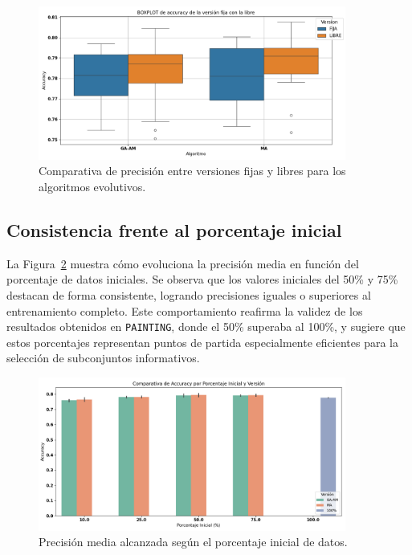 \begin{figure}[htp]
  \centering
  \includegraphics[width=0.9\textwidth]{imagenes/evaluaciones/cifar10/boxplot-libres.png}
  \caption{Comparativa de precisión entre versiones fijas y libres para los algoritmos evolutivos.}
  \label{fig:cifar10_fija_vs_libre}
\end{figure}

\subsection{Consistencia frente al porcentaje inicial}
La Figura~\ref{fig:cifar10_porcentaje} muestra cómo evoluciona la precisión media en función del porcentaje de datos iniciales.
Se observa que los valores iniciales del 50\% y 75\% destacan de forma consistente, logrando precisiones iguales o superiores al entrenamiento completo.
Este comportamiento reafirma la validez de los resultados obtenidos en \texttt{PAINTING}, donde el 50\% superaba al 100\%,
y sugiere que estos porcentajes representan puntos de partida especialmente eficientes para la selección de subconjuntos informativos.

\begin{figure}[htp]
  \centering
  \includegraphics[width=0.9\textwidth]{imagenes/evaluaciones/cifar10/comparacion_por_porcentaje.png}
  \caption{Precisión media alcanzada según el porcentaje inicial de datos.}
  \label{fig:cifar10_porcentaje}
\end{figure}

